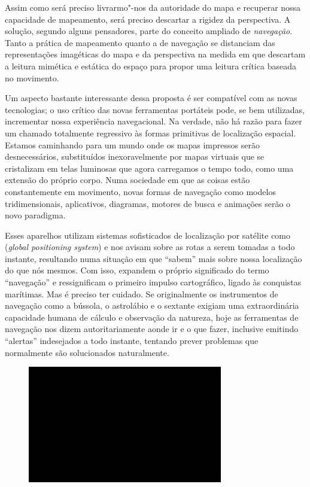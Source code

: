Assim como será preciso livrarmo"-nos da autoridade do mapa e recuperar
nossa capacidade de mapeamento, será preciso descartar a rigidez da
perspectiva. A solução, segundo alguns pensadores, parte do conceito
ampliado de \emph{navegação}. Tanto a prática de mapeamento quanto a de
navegação se distanciam das representações imagéticas do mapa e da
perspectiva na medida em que descartam a leitura mimética e estática do
espaço para propor uma leitura crítica baseada no movimento.

Um aspecto bastante interessante dessa proposta é ser compatível com as
novas tecnologias; o uso crítico das novas ferramentas portáteis pode,
se bem utilizadas, incrementar nossa experiência navegacional. Na
verdade, não há razão para fazer um chamado totalmente regressivo às
formas primitivas de localização espacial. Estamos caminhando para um
mundo onde os mapas impressos serão desnecessários, substituídos
inexoravelmente por mapas virtuais que se cristalizam em telas luminosas
que agora carregamos o tempo todo, como uma extensão do próprio corpo.
Numa sociedade em que as coisas estão constantemente em movimento, novas
formas de navegação como modelos tridimensionais, aplicativos,
diagramas, motores de busca e animações serão o novo paradigma.

Esses aparelhos utilizam sistemas sofisticados de localização por
satélite como  (\emph{global positioning system}) e nos avisam sobre
as rotas a serem tomadas a todo instante, resultando numa situação em
que ``sabem'' mais sobre nossa localização do que nós mesmos. Com isso,
expandem o próprio significado do termo ``navegação'' e ressignificam o
primeiro impulso cartográfico, ligado às conquistas marítimas. Mas é
preciso ter cuidado. Se originalmente os instrumentos de navegação como
a bússola, o astrolábio e o sextante exigiam uma extraordinária
capacidade humana de cálculo e observação da natureza, hoje as
ferramentas de navegação nos dizem autoritariamente aonde ir e o que
fazer, inclusive emitindo ``alertas'' indesejados a todo instante,
tentando prever problemas que normalmente são solucionados naturalmente.

\begin{figure}[!ht]

\centering
 \includegraphics[width=85mm]{./imgs/im1.jpg}
\caption{\tiny{}}

\end{figure}

